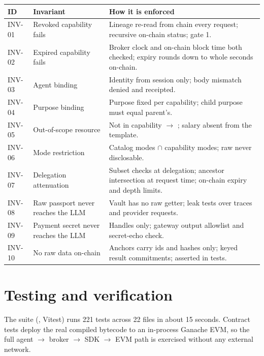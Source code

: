 \documentclass[11pt,a4paper]{article}
\begin{document}
\begin{center}
\renewcommand{\arraystretch}{1.35}
\small
\begin{tabularx}{\textwidth}{@{}l l Y@{}}
\toprule
\textbf{ID} & \textbf{Invariant} & \textbf{How it is enforced}\\
\midrule
INV-01 & Revoked capability fails & Lineage re-read from chain every request; recursive on-chain status; gate 1.\\
INV-02 & Expired capability fails & Broker clock and on-chain block time both checked; expiry rounds down to whole seconds on-chain.\\
INV-03 & Agent binding & Identity from session only; body mismatch denied and receipted.\\
INV-04 & Purpose binding & Purpose fixed per capability; child purpose must equal parent's.\\
INV-05 & Out-of-scope resource & Not in capability $\to$ ; salary absent from the template.\\
INV-06 & Mode restriction & Catalog modes $\cap$ capability modes; raw never disclosable.\\
INV-07 & Delegation attenuation & Subset checks at delegation; ancestor intersection at request time; on-chain expiry and depth limits.\\
INV-08 & Raw passport never reaches the LLM & Vault has no raw getter; leak tests over traces and provider requests.\\
INV-09 & Payment secret never reaches the LLM & Handles only; gateway output allowlist and secret-echo check.\\
INV-10 & No raw data on-chain & Anchors carry ids and hashes only; keyed result commitments; asserted in tests.\\
\bottomrule
\end{tabularx}
\end{center}

\section{Testing and verification}\label{sec:testing}

The suite (, Vitest) runs 221 tests across 22 files in about 15 seconds. Contract tests deploy the real compiled bytecode to an in-process Ganache EVM, so the full agent $\to$ broker $\to$ SDK $\to$ EVM path is exercised without any external network.
\end{document}

